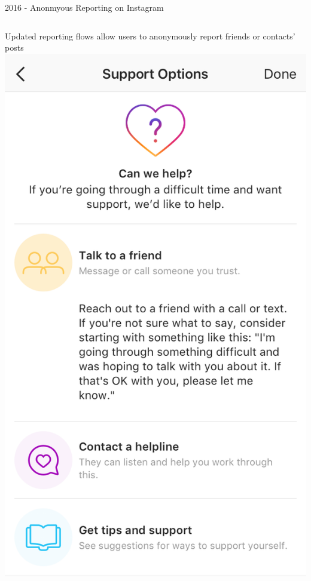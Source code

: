 \documentclass[nobackground,dvipsnames,table,aspectratio=169]{beamer}
\begin{document}
\begin{frame}{2016 - Anonmyous Reporting on Instagram}
    \begin{columns}
            \large
            Updated reporting flows allow users to anonymously report friends or contacts’ posts
            \includegraphics[width=\textwidth]{anonymous-reporting-instagram}
    \end{columns}
\end{frame}
\end{document}

